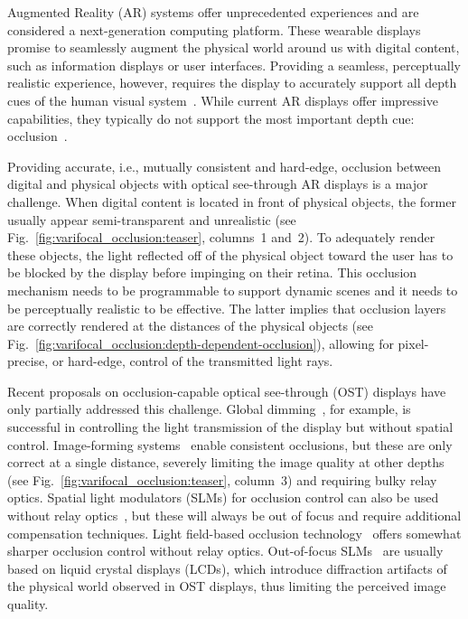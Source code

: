 

Augmented Reality (AR) systems offer unprecedented experiences and are considered a next-generation computing platform. These wearable displays promise to seamlessly augment the physical world around us with digital content, such as information displays or user interfaces. Providing a seamless, perceptually realistic experience, however, requires the display to accurately support all depth cues of the human visual system~\cite{Palmer:1999,Howard:2002}. While current AR displays offer impressive capabilities, they typically do not support the most important depth cue: occlusion~\cite{cutting1995perceiving}.

Providing accurate, i.e., mutually consistent and hard-edge, occlusion between digital and physical objects with optical see-through AR displays is a major challenge. When digital content is located in front of physical objects, the former usually appear semi-transparent and unrealistic (see Fig.~\ref{fig:varifocal_occlusion:teaser}, columns~1 and~2). To adequately render these objects, the light reflected off of the physical object toward the user has to be blocked by the display before impinging on their retina. This occlusion mechanism needs to be programmable to support dynamic scenes and it needs to be perceptually realistic to be effective. The latter implies that occlusion layers are correctly rendered at the distances of the physical objects (see Fig.~\ref{fig:varifocal_occlusion:depth-dependent-occlusion}), allowing for pixel-precise, or hard-edge, control of the transmitted light rays.

Recent proposals on occlusion-capable optical see-through (OST) displays have only partially addressed this challenge. Global dimming~\cite{Mori2018}, for example, is successful in controlling the light transmission of the display but without spatial control. Image-forming systems~\cite{Kiyokawa2003,Cakmakci2004,Gao2012} enable consistent occlusions, but these are only correct at a single distance, severely limiting the image quality at other depths (see Fig.~\ref{fig:varifocal_occlusion:teaser}, column~3) and requiring bulky relay optics. Spatial light modulators (SLMs) for occlusion control can also be used without relay optics~\cite{Itoh2017}, but these will always be out of focus and require additional compensation techniques. Light field-based occlusion technology~\cite{maimone2013general} offers somewhat sharper occlusion control without relay optics. Out-of-focus SLMs~\cite{maimone2013general,Itoh2017} are usually based on liquid crystal displays (LCDs), which introduce diffraction artifacts of the physical world observed in OST displays, thus limiting the perceived image quality.

